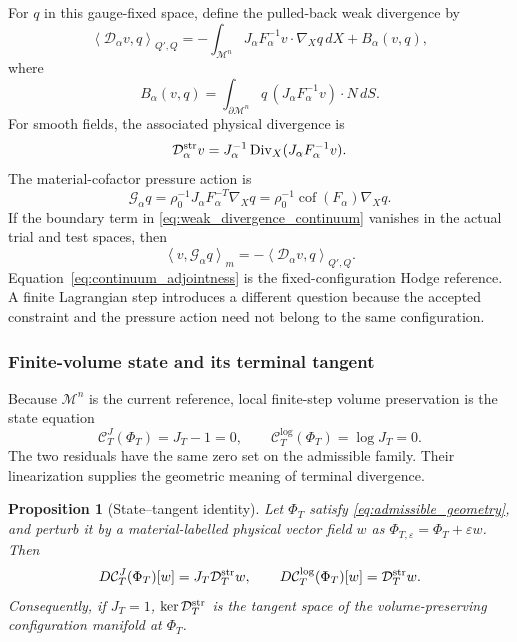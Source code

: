 \documentclass[11pt]{article}
\theoremstyle{plain}
\newtheorem{proposition}[theorem]{Proposition}
\theoremstyle{definition}
\theoremstyle{remark}
\newcommand{\M}{\mathcal{M}}
\newcommand{\D}{\mathcal{D}}
\newcommand{\G}{\mathcal{G}}
\newcommand{\Div}{\operatorname{Div}}
\newcommand{\cof}{\operatorname{cof}}
\newcommand{\kernel}{\operatorname{ker}}
\newcommand{\ip}[3][]{\left\langle #2,#3\right\rangle_{#1}}
\begin{document}
For $q$ in this gauge-fixed space, define the pulled-back weak divergence by
\begin{equation}
 \ip[Q',Q]{\D_\alpha v}{q}
 =-\int_{\M^n}J_\alpha F_\alpha^{-1}v\cdot\nabla_Xq\,dX
   +B_\alpha(v,q),
 \label{eq:weak_divergence_continuum}
\end{equation}
where
\begin{equation}
 B_\alpha(v,q)=\int_{\partial\M^n}
 q\,(J_\alpha F_\alpha^{-1}v)\cdot N\,dS.
 \label{eq:boundary_form}
\end{equation}
For smooth fields, the associated physical divergence is
\begin{equation}
  \D_\alpha^{\rm str}v
  =J_\alpha^{-1}\Div_X(J_\alpha F_\alpha^{-1}v).
  \label{eq:strong_piola_divergence}
\end{equation}
The material-cofactor pressure action is
\begin{equation}
  \G_\alpha q
  =\rho_0^{-1}J_\alpha F_\alpha^{-T}\nabla_Xq
  =\rho_0^{-1}\cof(F_\alpha)\nabla_Xq.
  \label{eq:continuum_pressure_action}
\end{equation}
If the boundary term in \eqref{eq:weak_divergence_continuum} vanishes in the
actual trial and test spaces, then
\begin{equation}
  \ip[m]{v}{\G_\alpha q}
  =-\ip[Q',Q]{\D_\alpha v}{q}.
  \label{eq:continuum_adjointness}
\end{equation}
Equation~\eqref{eq:continuum_adjointness} is the fixed-configuration Hodge
reference.  A finite Lagrangian step introduces a different question because
the accepted constraint and the pressure action need not belong to the same
configuration.

\subsubsection{Finite-volume state and its terminal tangent}
\label{sec:state_tangent_bridge}

Because $\M^n$ is the current reference, local finite-step volume preservation
is the state equation
\begin{equation}
 \mathcal C_T^J(\Phi_T)=J_T-1=0,
 \qquad
 \mathcal C_T^{\log}(\Phi_T)=\log J_T=0.
 \label{eq:finite_volume_state_residuals}
\end{equation}
The two residuals have the same zero set on the admissible family.  Their
linearization supplies the geometric meaning of terminal divergence.

\begin{proposition}[State--tangent identity]
\label{prop:state_tangent_identity}
Let $\Phi_T$ satisfy \eqref{eq:admissible_geometry}, and perturb it by a
material-labelled physical vector field $w$ as
$\Phi_{T,\varepsilon}=\Phi_T+\varepsilon w$.  Then
\begin{equation}
 D\mathcal C_T^J(\Phi_T)[w]=J_T\D_T^{\rm str}w,
 \qquad
 D\mathcal C_T^{\log}(\Phi_T)[w]=\D_T^{\rm str}w.
 \label{eq:state_tangent_variations}
\end{equation}
Consequently, if $J_T=1$, $\kernel\D_T^{\rm str}$ is the tangent space of the
volume-preserving configuration manifold at $\Phi_T$.
\end{proposition}
\end{document}
